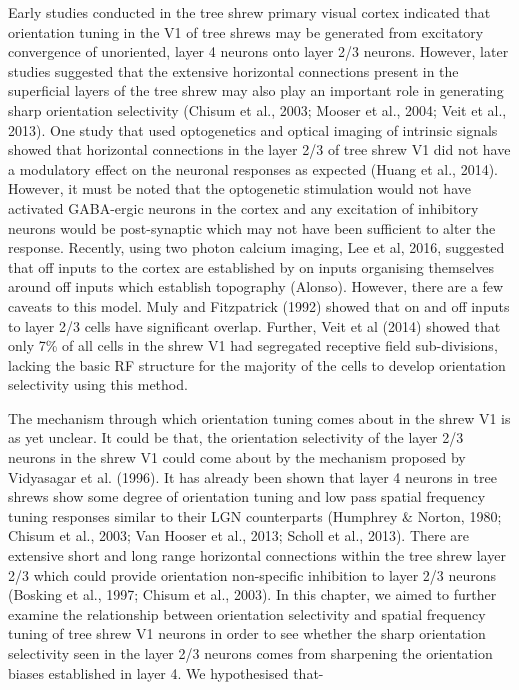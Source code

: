 Early studies conducted in the tree shrew primary visual cortex indicated that orientation tuning in the V1 of tree shrews may be generated from excitatory convergence of unoriented, layer 4 neurons onto layer 2/3 neurons. However, later studies suggested that the  extensive horizontal connections present in the superficial layers of the tree shrew may also play an important role in generating sharp orientation selectivity (Chisum et al., 2003; Mooser et al., 2004; Veit et al., 2013). One study that used optogenetics and optical imaging of intrinsic signals showed that horizontal connections in the layer 2/3 of tree shrew V1 did not have a modulatory effect on the neuronal responses as expected (Huang et al., 2014). However, it must be noted that the optogenetic stimulation would not have activated GABA-ergic neurons in the cortex and any excitation of inhibitory neurons would be post-synaptic which may not have been sufficient to alter the response. Recently, using two photon calcium imaging, Lee et al, 2016, suggested that off inputs to the cortex are established by on inputs organising themselves around off inputs which establish topography (Alonso). However, there are a few caveats to this model. Muly and Fitzpatrick (1992) showed that on and off inputs to layer 2/3 cells have significant overlap. Further, Veit et al (2014) showed that only 7\% of all cells in the shrew V1 had segregated receptive field sub-divisions, lacking the basic RF structure for the majority of the cells to develop orientation selectivity using this method.

The mechanism through which orientation tuning comes about in the shrew V1 is as yet unclear. It could be that, the orientation selectivity of the layer 2/3 neurons in the shrew V1 could come about by the mechanism proposed by Vidyasagar et al. (1996). It has already been shown that layer 4 neurons in tree shrews show some degree of orientation tuning and low pass spatial frequency tuning responses similar to their LGN counterparts (Humphrey \& Norton, 1980; Chisum et al., 2003; Van Hooser et al., 2013; Scholl et al., 2013). There are extensive short and long range horizontal connections within the tree shrew layer 2/3 which could provide orientation non-specific inhibition to layer 2/3 neurons (Bosking et al., 1997; Chisum et al., 2003). In this chapter, we aimed to further examine the relationship between orientation selectivity and spatial frequency tuning of tree shrew V1 neurons in order to see whether the sharp orientation selectivity seen in the layer 2/3 neurons comes from sharpening the orientation biases established in layer 4. We hypothesised that-


